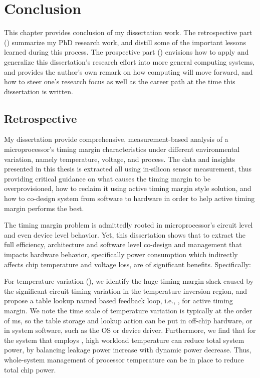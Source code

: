 
\chapter{Conclusion}
\label{sec:conc}

This chapter provides conclusion of my dissertation work. The retrospective part () summarize my PhD research work, and distill some of the important lessons learned during this process. The prospective part () envisions how to apply and generalize this dissertation's research effort into more general computing systems, and provides the author's own remark on how computing will move forward, and how to steer one's research focus as well as the career path at the time this dissertation is written.

\section{Retrospective}
\label{sec:conc:retro}

My dissertation provide comprehensive, measurement-based analysis of a microprocessor's timing margin characteristics under different environmental variation, namely temperature, voltage, and process. The data and insights presented in this thesis is extracted all using in-silicon sensor measurement, thus providing critical guidance on what causes the timing margin to be overprovisioned, how to reclaim it using active timing margin style solution, and how to co-design system from software to hardware in order to help active timing margin performs the best.

The timing margin problem is admittedly rooted in microprocessor's circuit level and even device level behavior. Yet, this dissertation shows that to extract the full efficiency, architecture and software level co-design and management that impacts hardware behavior, specifically power consumption which indirectly affects chip temperature and voltage loss, are of significant benefits. Specifically:

For temperature variation (), we identify the huge timing margin slack caused by the significant circuit timing variation in the temperature inversion region, and propose a table lookup named based feedback loop, i.e., \tistates, for active timing margin. We note the time scale of temperature variation is typically at the order of ms, so the table storage and lookup action can be put in off-chip hardware, or in system software, such as the OS or device driver. Furthermore, we find that for the system that employs \tistates, high workload temperature can reduce total system power, by balancing leakage power increase with dynamic power decrease. Thus, whole-system management of processor temperature can be in place to reduce total chip power.


